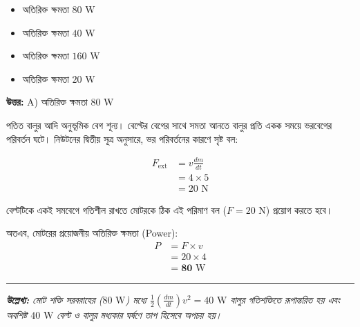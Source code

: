 \documentclass[12pt, a4paper]{article}
\begin{document}
\begin{itemize}[label={}, leftmargin=1cm, itemsep=0.5em]
    \item[\textbf{A)}] অতিরিক্ত ক্ষমতা $80\text{ W}$
    \item[\textbf{B)}] অতিরিক্ত ক্ষমতা $40\text{ W}$
    \item[\textbf{C)}] অতিরিক্ত ক্ষমতা $160\text{ W}$
    \item[\textbf{D)}] অতিরিক্ত ক্ষমতা $20\text{ W}$
\end{itemize}

\vspace{0.5em}
\begin{tcolorbox}[answerbox]
    \textbf{\color{success} উত্তর:} A) অতিরিক্ত ক্ষমতা $80\text{ W}$
\end{tcolorbox}
\vspace{1em}

\begin{tcolorbox}[solutionbox={সমাধান (Solution)}]
    \noindent
    পতিত বালুর আদি অনুভূমিক বেগ শূন্য। বেল্টের বেগের সাথে সমতা আনতে বালুর প্রতি একক সময়ে ভরবেগের পরিবর্তন ঘটে। নিউটনের দ্বিতীয় সূত্র অনুসারে, ভর পরিবর্তনের কারণে সৃষ্ট বল:
    
    \begin{align*}
        F_{\text{ext}} &= v \frac{dm}{dt} \\
        &= 4 \times 5 \\
        &= 20\text{ N}
    \end{align*}
    
    বেল্টটিকে একই সমবেগে গতিশীল রাখতে মোটরকে ঠিক এই পরিমাণ বল ($F = 20\text{ N}$) প্রয়োগ করতে হবে। 
    
    অতএব, মোটরের প্রয়োজনীয় অতিরিক্ত ক্ষমতা (Power):
    \begin{align*}
        P &= F \times v \\
        &= 20 \times 4 \\
        &= \mathbf{80}\text{ W}
    \end{align*}
    
    \vspace{0.5em}
    \hrule
    \vspace{0.5em}
    \noindent\textit{\footnotesize \textbf{উল্লেখ্য:} মোট শক্তি সরবরাহের ($80\text{ W}$) মধ্যে $\frac{1}{2} \left(\frac{dm}{dt}\right) v^2 = 40\text{ W}$ বালুর গতিশক্তিতে রূপান্তরিত হয় এবং অবশিষ্ট $40\text{ W}$ বেল্ট ও বালুর মধ্যকার ঘর্ষণে তাপ হিসেবে অপচয় হয়।}
\end{tcolorbox}
\end{document}
